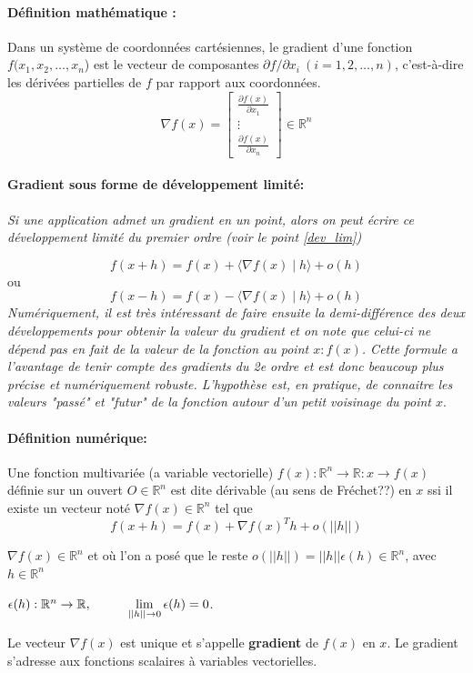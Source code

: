 	\paragraph*{Définition mathématique :} Dans un système de coordonnées cartésiennes, le gradient d'une fonction {$ f(x_{1},x_{2},\dots ,x_{n}$)} est le vecteur de composantes {$ \partial f/ \partial x_{i}\ (i=1,2,\dots ,n)$}, c'est-à-dire les dérivées partielles de $f$ par rapport aux coordonnées.
	$${\nabla f(x)={
	\begin{bmatrix}
	{\frac {\partial f(x)}{\partial x_{1}}}\\
	\vdots \\
	{\frac {\partial f(x)}{\partial x_{n}}}
	\end{bmatrix}}} \in \mathbb{R}^n $$
	\paragraph*{Gradient sous forme de développement limité:}
	\textit{Si une application admet un gradient en un point, alors on peut écrire ce développement limité du premier ordre (voir le point \ref{dev_lim})}
	
	$${
	f(x+h)=f(x)+\langle \nabla f(x)\mid h\rangle +o(h)
	}$$
	ou
	$$ {
	f(x-h)=f(x)-\langle \nabla f(x)\mid h\rangle +o(h)
	}$$
	\textit{Numériquement, il est très intéressant de faire ensuite la demi-différence des deux développements pour obtenir la valeur du gradient et on note que celui-ci ne dépend pas en fait de la valeur de la fonction au point $x : f (x)$. Cette formule a l'avantage de tenir compte des gradients du 2e ordre et est donc beaucoup plus précise et numériquement robuste. L'hypothèse est, en pratique, de connaitre les valeurs "passé" et "futur" de la fonction autour d'un petit voisinage du point $x$}.\\
	\paragraph*{Définition numérique:}
	Une fonction multivariée (a variable vectorielle)
	$ f(x)	: \mathbb{R}^n \rightarrow \mathbb{R} : x \rightarrow f(x) $ définie sur un ouvert $O \in \mathbb{R}^n$ est dite dérivable (au sens de Fréchet??) en $x$ ssi il existe un vecteur noté $\nabla f(x) \in \mathbb{R}^n$ tel que
	\begin{equation}
	f(x+h) = f(x) + \nabla f(x)^{T}h + o(||h||)
	\end{equation}
	
	$\nabla f(x) \in \mathbb{R}^n$ et où l’on a posé que le reste $o(||h||) = ||h||\epsilon (h) \in \mathbb{R}^n$, avec $h \in \mathbb{R}^n$
	\begin{center}
	$\epsilon (h): \mathbb{R}^n\rightarrow \mathbb{R}, \hspace{1 cm} \lim\limits_{||h|| \rightarrow 0} \epsilon(h)=0$.
	\end{center}
	Le vecteur $\nabla f(x)$ est unique et s’appelle \textbf{gradient} de $f(x)$ en $x$.
	Le gradient s’adresse aux fonctions scalaires à variables vectorielles.
